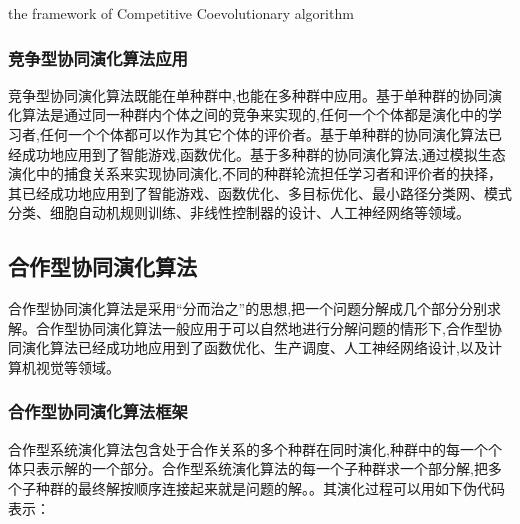 \documentclass[a4paper]{article}
\begin{document}
    \begin{algorithm}[H]
        
        \caption{the framework of Competitive Coevolutionary algorithm}
        \label{alg1}
        \onehalfspacing

        \begin{algorithmic}[1]
            \EndWhile
        \end{algorithmic}

    \end{algorithm}

    \subsubsection{竞争型协同演化算法应用}

    竞争型协同演化算法既能在单种群中,也能在多种群中应用。基于单种群的协同演化算法是通过同一种群内个体之间的竞争来实现的,任何一个个体都是演化中的学习者,任何一个个体都可以作为其它个体的评价者。基于单种群的协同演化算法已经成功地应用到了智能游戏,函数优化。基于多种群的协同演化算法,通过模拟生态演化中的捕食关系来实现协同演化,不同的种群轮流担任学习者和评价者的抉择，其已经成功地应用到了智能游戏、函数优化、多目标优化、最小路径分类网、模式分类、细胞自动机规则训练、非线性控制器的设计、人工神经网络等领域。

    \subsection{合作型协同演化算法}

    合作型协同演化算法是采用“分而治之”的思想,把一个问题分解成几个部分分别求解。合作型协同演化算法一般应用于可以自然地进行分解问题的情形下,合作型协同演化算法已经成功地应用到了函数优化、生产调度、人工神经网络设计,以及计算机视觉等领域。

    \subsubsection{合作型协同演化算法框架}
    合作型系统演化算法包含处于合作关系的多个种群在同时演化,种群中的每一个个体只表示解的一个部分。合作型系统演化算法的每一个子种群求一个部分解,把多个子种群的最终解按顺序连接起来就是问题的解。。其演化过程可以用如下伪代码表示：
\end{document}
